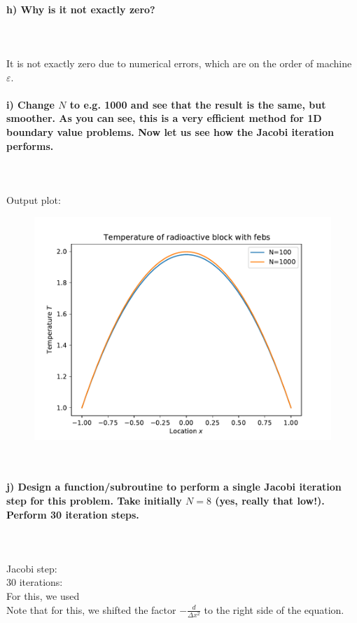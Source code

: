 \paragraph{
    h) Why is it not exactly zero?
} \ \\
    \\
    It is not exactly zero due to numerical errors,
    which are on the order of machine $\varepsilon$.

\newpage
\paragraph{
    i) Change $N$ to e.g. 1000 and see that the result is the same, but
    smoother. As you can see, this is a very efficient method for 1D
    boundary value problems. Now let us see how the Jacobi iteration
    performs.
} \ \\
    \\
    Output plot: 
    \begin{figure}[h!]
	\centering
	\includegraphics[width=.7\textwidth]{../figures/Aufg1h.pdf}
\end{figure} \ \\

\newpage
\paragraph{
    j) Design a function/subroutine to perform a single Jacobi iteration
    step for this problem. Take initially $N=8$ (yes, really that low!).
    Perform 30 iteration steps.
} \ \\
    \\
    Jacobi step:
     \ \\
    30 iterations:
     \ \\
    For this, we used
     \ \\
    Note that for this, we shifted the factor $-\frac{d}{\Delta x^2}$
    to the right side of the equation.

